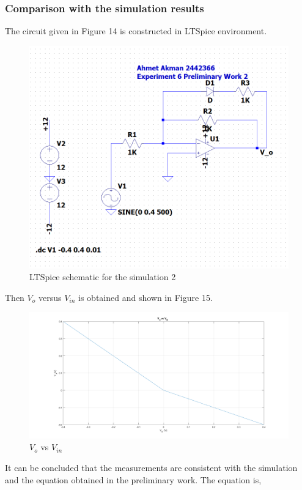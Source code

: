 \documentclass[letterpaper,12pt]{article}
\begin{document}
\subsubsection{Comparison with the simulation results}
The circuit given in Figure 14 is constructed in LTSpice environment.
\begin{figure}[H]
	\centering
   \includegraphics[width=1\textwidth]{Pre2.png}
   \caption{LTSpice schematic for the simulation 2 }
\end{figure}
Then \(V_{o}\) versus \(V_{in}\) is obtained and shown in Figure 15. 
\begin{figure}[H]
	\centering
   \includegraphics[width=1\textwidth]{Pre_2.png}
   \caption{\(V_{o}\) vs \(V_{in}\)}
\end{figure}
It can be concluded that the measurements are consistent with the simulation and the equation obtained in the preliminary work. The equation is,
\end{document}
